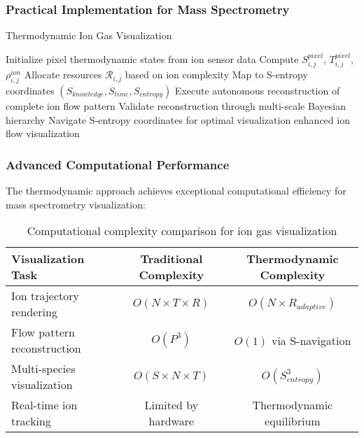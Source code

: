 \documentclass[11pt,a4paper]{article}
\theoremstyle{remark}
\begin{document}
\subsubsection{Practical Implementation for Mass Spectrometry}

\begin{algorithm}
\caption{Thermodynamic Ion Gas Visualization}
\begin{algorithmic}
    \State Initialize pixel thermodynamic states from ion sensor data
        \State Compute $S_{i,j}^{pixel}$, $T_{i,j}^{pixel}$, $\rho_{i,j}^{ion}$
        \State Allocate resources $\mathcal{R}_{i,j}$ based on ion complexity
        \State Map to S-entropy coordinates $(S_{knowledge}, S_{time}, S_{entropy})$
    \EndFor
    \State Execute autonomous reconstruction of complete ion flow pattern
    \State Validate reconstruction through multi-scale Bayesian hierarchy
    \State Navigate S-entropy coordinates for optimal visualization
    \State \Return enhanced ion flow visualization
\EndProcedure
\end{algorithmic}
\end{algorithm}

\subsubsection{Advanced Computational Performance}

The thermodynamic approach achieves exceptional computational efficiency for mass spectrometry visualization:

\begin{table}[H]
\centering
\begin{tabular}{lcc}
\toprule
Visualization Task & Traditional Complexity & Thermodynamic Complexity \\
\midrule
Ion trajectory rendering & $O(N \times T \times R)$ & $O(N \times R_{adaptive})$ \\
Flow pattern reconstruction & $O(P^3)$ & $O(1)$ via S-navigation \\
Multi-species visualization & $O(S \times N \times T)$ & $O(S_{entropy}^3)$ \\
Real-time ion tracking & Limited by hardware & Thermodynamic equilibrium \\
\bottomrule
\end{tabular}
\caption{Computational complexity comparison for ion gas visualization}
\end{table}
\end{document}

